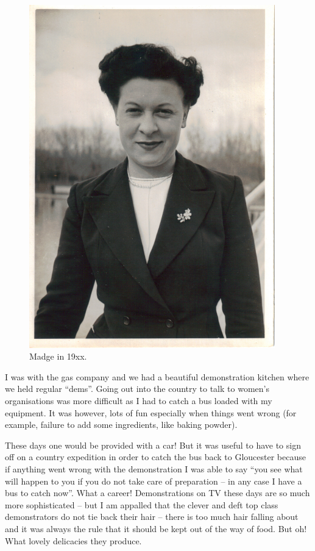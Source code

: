 \begin{figure}
  \centering
  \includegraphics[width=0.95\textwidth]{photos/madge-adult.jpg}
  \caption{Madge in 19xx.}
  \label{madge-adult}
\end{figure}

I was with the gas company and we had a beautiful demonstration
kitchen where we held regular ``dems''. Going out into the country to
talk to women's organisations was more difficult as I had to catch a
bus loaded with my equipment. It was however, lots of fun especially
when things went wrong (for example, failure to add some ingredients,
like baking powder).

These days one would be provided with a car! But it was useful to have
to sign off on a country expedition in order to catch the bus back to
Gloucester because if anything went wrong with the demonstration I was
able to say ``you see what will happen to you if you do not take care
of preparation -- in any case I have a bus to catch now''. What a
career! Demonstrations on TV these days are so much more sophisticated
-- but I am appalled that the clever and deft top class demonstrators
do not tie back their hair -- there is too much hair falling about and
it was always the rule that it should be kept out of the way of
food. But oh! What lovely delicacies they produce.

